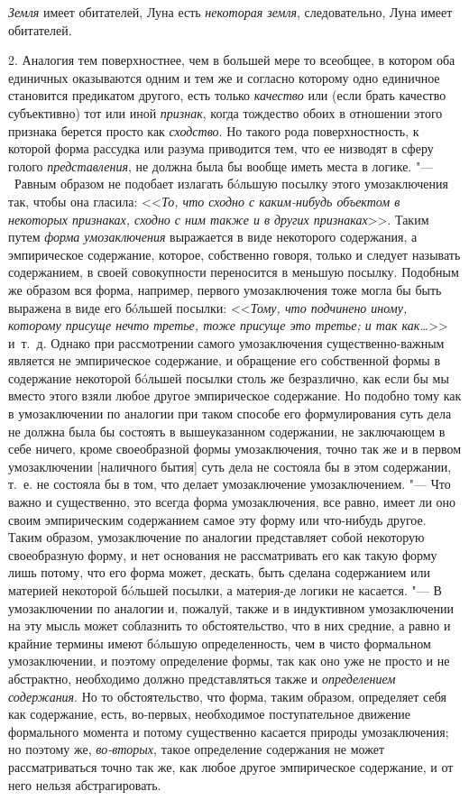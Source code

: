 {{{\em Земля} имеет обитателей,
Луна есть {\em некоторая земля},
следовательно, Луна имеет обитателей.

2. Аналогия тем поверхностнее, чем в большей мере то всеобщее,
в котором оба единичных оказываются одним и тем же и согласно которому одно
единичное становится предикатом другого, есть только
{\em качество} или (если
брать качество субъективно) тот или иной
{\em признак}, когда
тождество обоих в отношении этого признака берется просто как
{\em сходство}. Но такого
рода поверхностность, к которой форма рассудка или разума приводится тем,
что ее низводят в сферу голого
{\em представления}, не
должна была бы вообще иметь места в логике. "--- \ Равным
образом не подобает излагать бóльшую посылку этого умозаключения так, чтобы
она гласила: <<{\em То, что сходно с
каким-нибудь объектом в некоторых признаках, сходно с ним также и в других
признаках}>>. Таким путем
{\em форма умозаключения}
выражается в виде некоторого содержания, а эмпирическое
содержание, которое, собственно говоря, только и следует называть
содержанием, в своей совокупности переносится в меньшую посылку. Подобным
же образом вся форма, например, первого умозаключения тоже могла бы быть
выражена в виде его бóльшей посылки:
<<{\em Тому, что подчинено иному, которому присуще нечто третье,
тоже присуще это третье; и так как…}>> и~т.~д. Однако при рассмотрении самого
умозаключения существенно-важным является не эмпирическое содержание, и
обращение его собственной формы в содержание некоторой бóльшей посылки
столь же безразлично, как если бы мы вместо этого взяли
любое другое эмпирическое содержание. Но подобно тому как в умозаключении
по аналогии при таком способе его формулирования суть дела не должна была
бы состоять в вышеуказанном содержании, не заключающем в себе ничего, кроме
своеобразной формы умозаключения, точно так же и в первом умозаключении
[наличного бытия] суть дела не состояла бы в этом содержании, т.~е. не
состояла бы в том, что делает умозаключение умозаключением. "---
Что важно и существенно, это всегда форма умозаключения, все
равно, имеет ли оно своим эмпирическим содержанием самое эту форму или
что-нибудь другое. Таким образом, умозаключение по аналогии представляет
собой некоторую своеобразную форму, и нет основания не рассматривать его
как такую форму лишь потому, что его форма может, дескать, быть сделана
содержанием или материей некоторой бóльшей посылки, а материя-де логики не
касается. "--- В умозаключении по аналогии и, пожалуй, также и
в индуктивном умозаключении на эту мысль может соблазнить то
обстоятельство, что в них средние, а равно и крайние термины имеют бóльшую
определенность, чем в чисто формальном умозаключении, и поэтому определение
формы, так как оно уже не просто и не абстрактно, необходимо должно
представляться также и {\em определением
содержания}. Но то обстоятельство, что форма, таким образом,
определяет себя как содержание, есть, во-первых, необходимое поступательное
движение формального момента и потому существенно касается природы
умозаключения; но поэтому же,
{\em во-вторых}, такое
определение содержания не может рассматриваться точно так же, как любое
другое эмпирическое содержание, и от него нельзя абстрагировать.

}}
